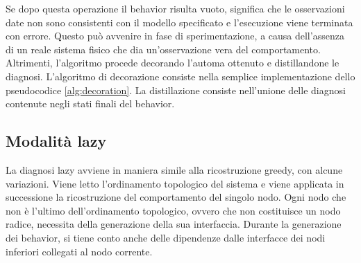 Se dopo questa operazione il behavior risulta vuoto, significa che le osservazioni date non sono consistenti con il modello specificato e l'esecuzione viene terminata con errore. Questo può avvenire in fase di sperimentazione, a causa dell'assenza di un reale sistema fisico che dia un'osservazione vera del comportamento.
Altrimenti, l'algoritmo procede decorando l'automa ottenuto e distillandone le diagnosi.
L'algoritmo di decorazione consiste nella semplice implementazione dello pseudocodice \ref{alg:decoration}. La distillazione consiste nell'unione delle diagnosi contenute negli stati finali del behavior.

\subsection{Modalità lazy}
La diagnosi lazy avviene in maniera simile alla ricostruzione greedy, con alcune variazioni. 
Viene letto l'ordinamento topologico del sistema e viene applicata in successione la ricostruzione del comportamento del singolo nodo. Ogni nodo che non è l'ultimo dell'ordinamento topologico, ovvero che non costituisce un nodo radice, necessita della generazione della sua interfaccia. Durante la generazione dei behavior, si tiene conto anche delle dipendenze dalle interfacce dei nodi inferiori collegati al nodo corrente.


